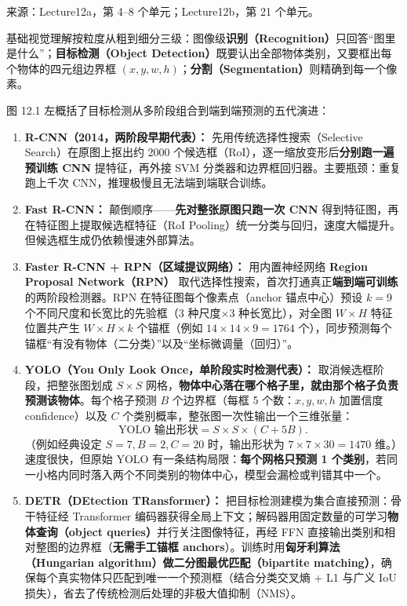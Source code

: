 来源：Lecture12a，第 4–8 个单元；Lecture12b，第 21 个单元。



基础视觉理解按粒度从粗到细分三级：图像级\textbf{识别（Recognition）}只回答“图里是什么”；\textbf{目标检测（Object Detection）}既要认出全部物体类别，又要框出每个物体的四元组边界框 $(x,y,w,h)$；\textbf{分割（Segmentation）}则精确到每一个像素。


图 12.1 左概括了目标检测从多阶段组合到端到端预测的五代演进：
\begin{enumerate}
\item \textbf{R-CNN（2014，两阶段早期代表）：} 先用传统选择性搜索（Selective Search）在原图上抠出约 2000 个候选框（RoI），逐一缩放变形后\textbf{分别跑一遍预训练 CNN} 提特征，再外接 SVM 分类器和边界框回归器。主要瓶颈：重复跑上千次 CNN，推理极慢且无法端到端联合训练。
\item \textbf{Fast R-CNN：} 颠倒顺序——\textbf{先对整张原图只跑一次 CNN} 得到特征图，再在特征图上提取候选框特征（RoI Pooling）统一分类与回归，速度大幅提升。但候选框生成仍依赖慢速外部算法。
\item \textbf{Faster R-CNN + RPN（区域提议网络）：} 用内置神经网络 \textbf{Region Proposal Network（RPN）} 取代选择性搜索，首次打通真正\textbf{端到端可训练}的两阶段检测器。RPN 在特征图每个像素点（anchor 锚点中心）预设 $k=9$ 个不同尺度和长宽比的先验框（3 种尺度\ensuremath{\times}3 种长宽比），对全图 $W\times H$ 特征位置共产生 $W\times H\times k$ 个锚框（例如 $14\times 14\times 9 = 1764$ 个），同步预测每个锚框“有没有物体（二分类）”以及“坐标微调量（回归）”。
\item \textbf{YOLO（You Only Look Once，单阶段实时检测代表）：} 取消候选框阶段，把整张图划成 $S\times S$ 网格，\textbf{物体中心落在哪个格子里，就由那个格子负责预测该物体}。每个格子预测 $B$ 个边界框（每框 5 个数：$x,y,w,h$ 加置信度 confidence）以及 $C$ 个类别概率，整张图一次性输出一个三维张量：
\[
\text{YOLO 输出形状} = S \times S \times (C + 5B).
\tag{12.2}
\]
（例如经典设定 $S=7, B=2, C=20$ 时，输出形状为 $7\times 7\times 30 = 1470$ 维。）速度很快，但原始 YOLO 有一条结构局限：\textbf{每个网格只预测 1 个类别}，若同一小格内同时落入两个不同类别的物体中心，模型会漏检或判错其中一个。
\item \textbf{DETR（DEtection TRansformer）：} 把目标检测建模为集合直接预测：骨干特征经 Transformer 编码器获得全局上下文；解码器用固定数量的可学习\textbf{物体查询（object queries）}并行关注图像特征，再经 FFN 直接输出类别和相对整图的边界框（\textbf{无需手工锚框 anchors}）。训练时用\textbf{匈牙利算法（Hungarian algorithm）做二分图最优匹配（bipartite matching）}，确保每个真实物体只匹配到唯一一个预测框（结合分类交叉熵 + L1 与广义 IoU 损失），省去了传统检测后处理的非极大值抑制（NMS）。
\end{enumerate}

